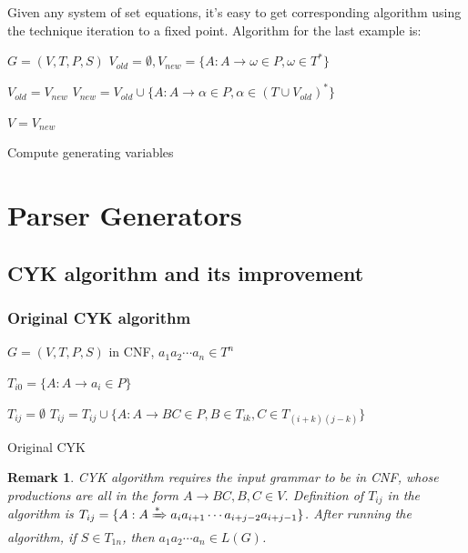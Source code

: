 \documentclass{beamer}
\newtheorem{remark}[theorem]{Remark}
\begin{document}
\begin{frame}
Given any system of set equations, it's easy to get corresponding algorithm using the technique iteration to a fixed point. Algorithm for the last example is:
\begin{algorithm}[H]
\begin{algorithmic}[1]

\REQUIRE $G=(V,T,P,S)$
\ENSURE $V_{old}=\emptyset, V_{new}=\{ A:A\to\omega\in P,\omega\in T^* \}$

\STATE $V_{old}=V_{new}$
\STATE $V_{new}=V_{old}\cup\{ A:A\to\alpha\in P, \alpha\in(T\cup V_{old})^* \}$
\ENDWHILE

\STATE $V=V_{new}$

\end{algorithmic}
\caption{Compute generating variables}
\label{alg:generating}
\end{algorithm}
\end{frame}

\section{Parser Generators}
\subsection{CYK algorithm and its improvement}
\begin{frame}
\frametitle{Original CYK algorithm}
\begin{algorithm}[H]
\begin{algorithmic}[1]

\REQUIRE $G=(V,T,P,S)$ in CNF, $a_1a_2\cdots a_n\in T^n$
\ENSURE 

\STATE $ T_{i0}=\{ A:A\to a_i\in P \} $
\ENDFOR

		\STATE $ T_{ij}=\emptyset $
			\STATE $ T_{ij}=T_{ij}\cup\{ A:A\to BC\in P, B\in T_{ik}, C\in T_{(i+k)(j-k)} \} $
		\ENDFOR
	\ENDFOR
\ENDFOR

\end{algorithmic}
\caption{Original CYK}
\label{alg:original_cyk}
\end{algorithm}
\end{frame}

\begin{frame}
\begin{remark}
CYK algorithm\cite{y}\cite{k} requires the input grammar to be in CNF, whose productions are all in the form $A\to BC, B, C\in V$. Definition of $T_{ij}$ in the algorithm is $T_{ij}=\{ A: A\xRightarrow[]{*}a_ia_{i+1}\cdots a_{i+j-2}a_{i+j-1} \}$. After running the algorithm, if $S\in T_{1n}$, then $a_1a_2\cdots a_n\in L(G)$.
\end{remark}
\end{frame}
\end{document}
